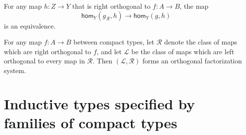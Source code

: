 \begin{prp}
For any map $h:Z\to Y$ that is right orthogonal to $f:A\to B$, the map
\begin{equation*}
\mathsf{hom}_Y(g_{\mathcal{R}},h)\to \mathsf{hom}_Y(g,h)
\end{equation*}
is an equivalence.
\end{prp}

\begin{thm}
For any map $f:A\to B$ between compact types, let $\mathcal{R}$ denote the class of maps which are right orthogonal to $f$, and let $\mathcal{L}$ be the class of maps which are left orthogonal to every map in $\mathcal{R}$. Then $(\mathcal{L},\mathcal{R})$ forms an orthogonal factorization system.
\end{thm}

\section{Inductive types specified by families of compact types}
